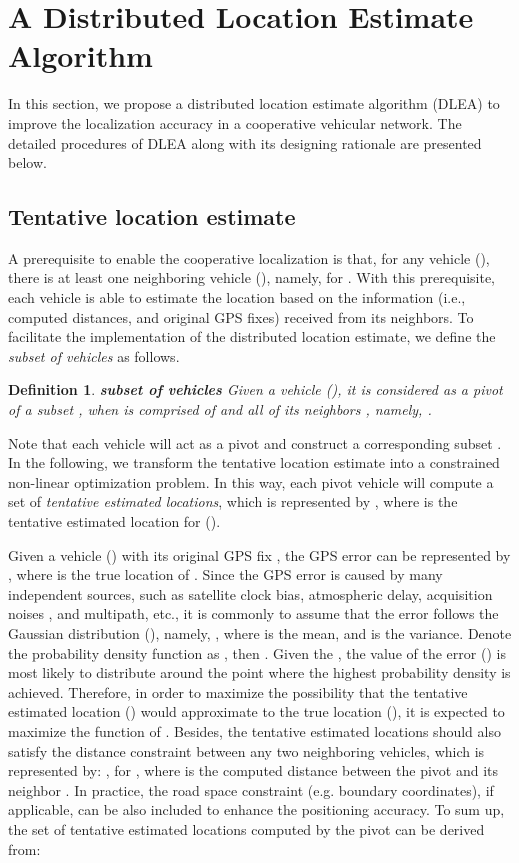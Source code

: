 \documentclass[letterpaper, 10 pt, conference]{ieeeconf}
\newtheorem{definition}{\hspace{1em}Definition}
\begin{document}
\section{A Distributed Location Estimate Algorithm} \label{alg}
In this section, we propose a distributed location estimate algorithm (DLEA) to improve the localization accuracy in a cooperative vehicular network. The detailed procedures of  DLEA along with its designing rationale are presented below.

\subsection{Tentative location estimate}
A prerequisite to enable the cooperative localization is that, for any vehicle  (), there is at least one neighboring vehicle  (),  namely,  for . With this prerequisite, each vehicle  is able to estimate the location based on the information (i.e., computed distances, and original GPS fixes) received from its neighbors. To facilitate the implementation of the distributed location estimate, we define the \emph{subset of vehicles} as follows.

\begin{definition}\label{def1}
\textbf{subset of vehicles} Given a vehicle  (), it is considered as a pivot of a subset  , when  is comprised of  and all of its neighbors , namely,  .
\end{definition}


Note that each vehicle  will act as a pivot and construct a corresponding subset . In the following, we transform the tentative location estimate into a constrained non-linear optimization problem. In this way, each pivot vehicle  will compute a set of \emph{tentative estimated locations}, which is represented by , where  is the tentative estimated location for  ().


Given a vehicle  () with its original GPS fix , the GPS error  can be represented by , where  is the true location of . Since the GPS error is caused by many independent sources, such as satellite clock bias, atmospheric delay, acquisition noises , and multipath, etc., it is commonly to assume that the error  follows the Gaussian distribution (\cite{parker2006vehicle,drawil2009toward}), namely,  , where  is the mean, and  is the variance. Denote the probability density function as , then . Given the  ,  the value of the error  () is most likely to distribute around the point where the highest probability density is achieved. Therefore, in order to maximize the possibility that the tentative estimated location () would approximate to the true location (), it is expected to maximize the function of . Besides, the tentative estimated locations should also satisfy the distance constraint between any two neighboring vehicles, which is represented by: , for  , where  is the computed distance between the pivot  and its neighbor . In practice, the road space constraint (e.g.  boundary coordinates), if applicable, can be also included to enhance the positioning accuracy. To sum up, the set of tentative estimated locations  computed by the pivot   can be derived from:
\end{document}
